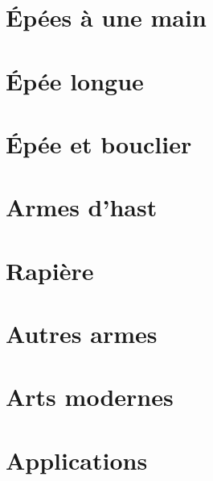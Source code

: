 \documentclass[10pt, a4paper, oneside, titlepage]{book}
\begin{document}
\part{Épées à une main}



% 


\part{Épée longue}






\part{Épée et bouclier}





% 


\part{Armes d'hast}





% 
% 


\part{Rapière}





\part{Autres armes}




\part{Arts modernes}


% 


\part{Applications}
\label{part:applications}
\end{document}
